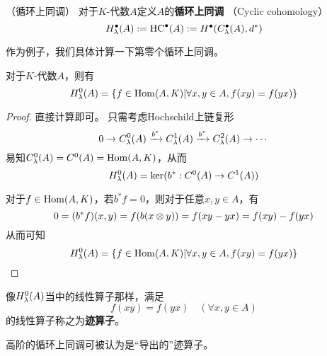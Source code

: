 
\begin{definition}（循环上同调）
对于$K$-代数$A$定义$A$的\textbf{循环上同调}
（Cyclic cohomology）
$$H^{\bullet}_{\lambda}(A):=\operatorname{HC}^{\bullet}(A)
:=H^{\bullet}(C_{\lambda}^{\bullet}(A),d^*)$$
\end{definition}

作为例子，我们具体计算一下第零个循环上同调。

\begin{example}对于$K$-代数$A$，则有
$$H^0_{\lambda}(A)=\{f\in\operatorname{Hom}(A,K)|
\forall x,y\in A,f(xy)=f(yx)\}$$
\end{example}

\begin{proof}直接计算即可。
只需考虑Hochschild上链复形
$$0\to C^0_\lambda(A)\xrightarrow{b^*}C^1_{\lambda}(A)
\xrightarrow{b^*}C^2_{\lambda}(A)\to\cdots$$
易知$C^0_{\lambda}(A)=C^0(A)=\operatorname{Hom}(A,K)$，从而
$$H^0_{\lambda}(A)=\ker(b^*:C^0(A)\to C^1(A))$$

对于$f\in\operatorname{Hom}(A,K)$，若$b^*f=0$，则对于任意$x,y\in A$，有
$$0=(b^*f)(x,y)=f(b(x\otimes y))=f(xy-yx)=f(xy)-f(yx)$$
从而可知
$$H^0_{\lambda}(A)=\{f\in\operatorname{Hom}(A,K)|
\forall x,y\in A,f(xy)=f(yx)\}$$
\end{proof}

像$H^0_{\lambda}(A)$当中的线性算子那样，满足
$$f(xy)=f(yx)\quad(\forall x,y\in A)$$
的线性算子称之为\textbf{迹算子}。

高阶的循环上同调可被认为是“导出的”迹算子。



